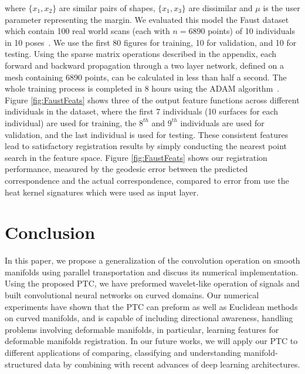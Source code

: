 \documentclass[10pt,twocolumn,letterpaper]{article}
\begin{document}
where $\{x_1,x_2\}$ are similar pairs of shapes, $\{x_1,x_3\}$ are dissimilar and $\mu$ is the user parameter representing the margin. We evaluated this model the Faust dataset which contain 100 real world scans (each with $n = 6890$ points) of 10 individuals in 10 poses~\cite{bogo2014faust}. We use the first 80 figures for training, 10 for validation, and 10 for testing. Using the sparse matrix operations described in the appendix, each forward and backward propagation through a two layer network, defined on a mesh containing 6890 points, can be calculated in less than half a second. The whole training process is completed in 8 hours using the ADAM algorithm~\cite{kingma2014adam}.  Figure \ref{fig:FaustFeats} shows three of the output feature functions across different individuals in the dataset, where the first 7 individuals (10 surfaces for each individual) are used for training, the $8^{th}$ and $9^{th}$ individuals are used for validation, and the last individual is used for testing. These consistent features lead to satisfactory registration results by simply conducting the nearest point search in the feature space.  Figure \ref{fig:FaustFeats} shows our registration performance, measured by the geodesic error between the predicted correspondence and the actual correspondence, compared to error from use the heat kernel signatures which were used as input layer. 


%



\section{Conclusion}
\label{sec:conclusion}
In this paper, we propose a generalization of the convolution operation on smooth manifolds using parallel transportation and discuss its numerical implementation. Using the proposed PTC, we have preformed wavelet-like operation of signals and built convolutional neural networks on curved domains. Our numerical experiments have shown that the PTC can preform as well as Euclidean methods on curved manifolds, and is capable of including directional awareness, handling problems involving deformable manifolds, in particular, learning features for deformable manifolds registration. In our future works, we will apply our PTC to different applications of comparing, classifying and understanding manifold-structured data by combining with recent advances of deep learning architectures.
\end{document}
